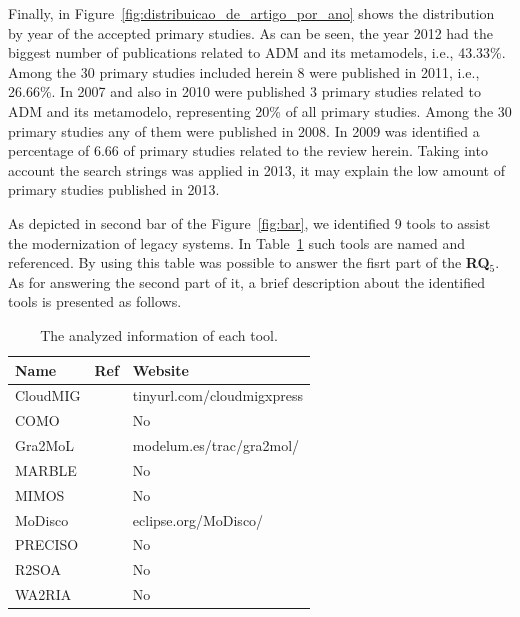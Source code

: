 Finally, in Figure~\ref{fig:distribuicao_de_artigo_por_ano} shows the distribution by year of the accepted primary studies. As can be seen, the year 2012 had the biggest number of publications related to ADM and its metamodels, i.e., 43.33\%. Among the 30 primary studies included herein 8 were published in 2011, i.e., 26.66\%. In 2007 and also in 2010 were published 3 primary studies related to ADM and its metamodelo, representing 20\% of all primary studies. Among the 30 primary studies any of them were published in 2008. In 2009 was identified a percentage of 6.66 of primary studies related to the review herein. Taking into account the search strings was applied in 2013, it may explain the low amount of primary studies published in 2013. 



As depicted in second bar of the Figure~\ref{fig:bar}, we identified 9 tools to assist the modernization of legacy systems. In Table~\ref{tab:tools} such tools are named and referenced. By using this table was possible to  answer the fisrt part of the \textbf{RQ$_5$}. As for answering the second part of it, a brief description about the identified tools is presented as follows. 



\begin{table}
\scriptsize
\centering
\caption{The analyzed information of each tool.}
  \begin{tabular}{|l|l|l|}
\hline 
\cellcolor{gray}Name & \cellcolor{gray}Ref & \cellcolor{gray}Website\tabularnewline
\hline 
\hline 
CloudMIG &\cite{SMR:SMR582}  & tinyurl.com/cloudmigxpress\tabularnewline
\hline 
COMO &\cite{5773392}  & No\tabularnewline
\hline 
Gra2MoL &\cite{5440163}  & modelum.es/trac/gra2mol/\tabularnewline
\hline 
MARBLE &\cite{Perez-Castillo:2011:ECS:1982185.1982249,6080834, 6498507,Perez-Castillo:2010:IBP:1875847.1875861,5871783}  & No\tabularnewline
\hline 
MIMOS &~\cite{6498507} & No\tabularnewline
\hline 
MoDisco &~\cite{Bruneliere:2010:MGE:1858996.1859032} & eclipse.org/MoDisco/\tabularnewline
\hline 
PRECISO &~\cite{delCastillo:2009:PRP:1529282.1529753}  & No\tabularnewline
\hline 
R2SOA &~\cite{Guzman:2007:AAR:1339262.1339532} & No\tabularnewline
\hline 
WA2RIA &~\cite{Rodriguez-Echeverria:2011:MLW:2186508.2186536}  & No\tabularnewline
\hline 
\end{tabular}
\label{tab:tools}
\end{table}



